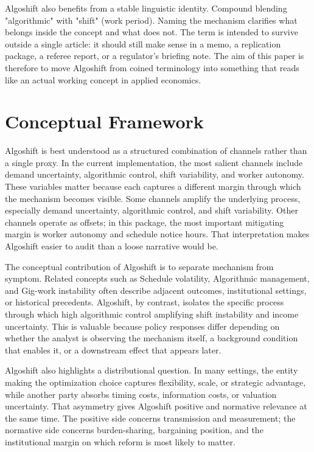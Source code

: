 \documentclass[12pt]{article}
\begin{document}
Algoshift also benefits from a stable linguistic identity. Compound blending "algorithmic" with "shift" (work period). Naming the mechanism clarifies what belongs inside the concept and what does not. The term is intended to survive outside a single article: it should still make sense in a memo, a replication package, a referee report, or a regulator's briefing note. The aim of this paper is therefore to move Algoshift from coined terminology into something that reads like an actual working concept in applied economics.

\section{Conceptual Framework}
Algoshift is best understood as a structured combination of channels rather than a single proxy. In the current implementation, the most salient channels include demand uncertainty, algorithmic control, shift variability, and worker autonomy. These variables matter because each captures a different margin through which the mechanism becomes visible. Some channels amplify the underlying process, especially demand uncertainty, algorithmic control, and shift variability. Other channels operate as offsets; in this package, the most important mitigating margin is worker autonomy and schedule notice hours. That interpretation makes Algoshift easier to audit than a loose narrative would be.

The conceptual contribution of Algoshift is to separate mechanism from symptom. Related concepts such as Schedule volatility, Algorithmic management, and Gig-work instability often describe adjacent outcomes, institutional settings, or historical precedents. Algoshift, by contrast, isolates the specific process through which high algorithmic control amplifying shift instability and income uncertainty. This is valuable because policy responses differ depending on whether the analyst is observing the mechanism itself, a background condition that enables it, or a downstream effect that appears later.

Algoshift also highlights a distributional question. In many settings, the entity making the optimization choice captures flexibility, scale, or strategic advantage, while another party absorbs timing costs, information costs, or valuation uncertainty. That asymmetry gives Algoshift positive and normative relevance at the same time. The positive side concerns transmission and measurement; the normative side concerns burden-sharing, bargaining position, and the institutional margin on which reform is most likely to matter.
\end{document}
